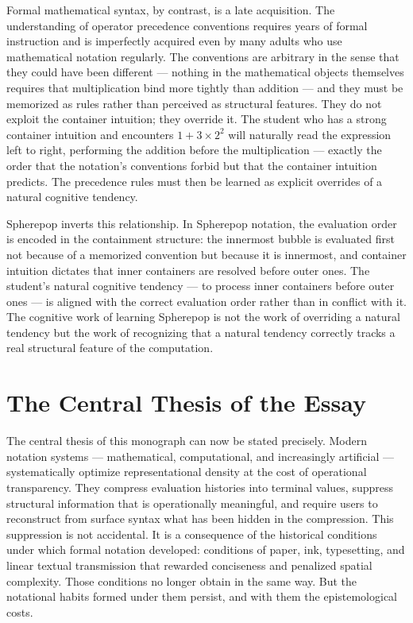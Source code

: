 \documentclass[12pt,openany]{book}
\theoremstyle{plain}
\theoremstyle{definition}
\theoremstyle{remark}
\begin{document}
Formal mathematical syntax, by contrast, is a late acquisition. The understanding of operator precedence conventions requires years of formal instruction and is imperfectly acquired even by many adults who use mathematical notation regularly. The conventions are arbitrary in the sense that they could have been different — nothing in the mathematical objects themselves requires that multiplication bind more tightly than addition — and they must be memorized as rules rather than perceived as structural features. They do not exploit the container intuition; they override it. The student who has a strong container intuition and encounters $1 + 3 \times 2^2$ will naturally read the expression left to right, performing the addition before the multiplication — exactly the order that the notation's conventions forbid but that the container intuition predicts. The precedence rules must then be learned as explicit overrides of a natural cognitive tendency.

Spherepop inverts this relationship. In Spherepop notation, the evaluation order is encoded in the containment structure: the innermost bubble is evaluated first not because of a memorized convention but because it is innermost, and container intuition dictates that inner containers are resolved before outer ones. The student's natural cognitive tendency — to process inner containers before outer ones — is aligned with the correct evaluation order rather than in conflict with it. The cognitive work of learning Spherepop is not the work of overriding a natural tendency but the work of recognizing that a natural tendency correctly tracks a real structural feature of the computation.

\section*{The Central Thesis of the Essay}

The central thesis of this monograph can now be stated precisely. Modern notation systems — mathematical, computational, and increasingly artificial — systematically optimize representational density at the cost of operational transparency. They compress evaluation histories into terminal values, suppress structural information that is operationally meaningful, and require users to reconstruct from surface syntax what has been hidden in the compression. This suppression is not accidental. It is a consequence of the historical conditions under which formal notation developed: conditions of paper, ink, typesetting, and linear textual transmission that rewarded conciseness and penalized spatial complexity. Those conditions no longer obtain in the same way. But the notational habits formed under them persist, and with them the epistemological costs.
\end{document}
